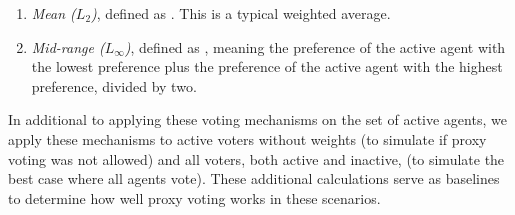 \begin{enumerate}
    \item {
        \textit{Mean ($L_2$)}, defined as
        $$.
        This is a typical weighted average.
    }
    \item {
        \textit{Mid-range ($L_\infty$)}, defined as
        $$, meaning the preference
        of the active agent with the lowest preference plus the preference of the
        active agent with the highest preference, divided by two.

    }
\end{enumerate}
In additional to applying these voting mechanisms on the set of active agents, we
apply these mechanisms to active voters without weights (to simulate if proxy voting was
not allowed) and all voters, both active and inactive, (to simulate the best case
where all agents vote).
These additional calculations serve as baselines to determine how well proxy voting
works in these scenarios.

